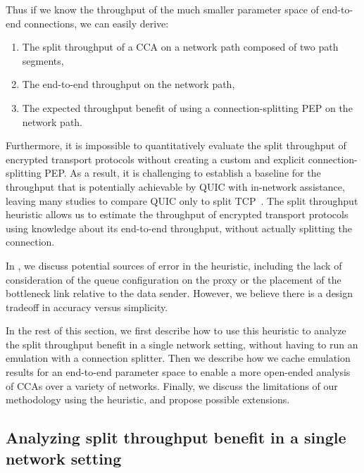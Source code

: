 

\noindent Thus if we know the throughput of the much smaller parameter
 space of end-to-end connections, we can easily derive:

\begin{enumerate}[noitemsep]
    \item The split throughput of a CCA on a network path composed of two path
     segments,
    \item The end-to-end throughput on the network path,
    \item The expected throughput benefit of using a connection-splitting PEP
     on the network path.
\end{enumerate}

Furthermore, it is impossible to quantitatively evaluate the split throughput
of encrypted transport protocols without creating a custom and explicit
connection-splitting PEP. As a result, it is challenging to establish a
baseline for the throughput that is potentially achievable by QUIC with
in-network assistance, leaving many studies to compare QUIC only to split TCP~\cite
{thomas2019google,border2020evaluating,yuan2024sidekick}. The split throughput
heuristic allows us to estimate the throughput of encrypted transport
protocols using knowledge about its end-to-end throughput, without
actually splitting the connection.

In , we discuss potential sources of error in the heuristic,
including the lack of consideration of the queue configuration on the proxy
or the placement of the bottleneck link relative to the data sender. However,
we believe there is a design tradeoff in accuracy versus simplicity.

In the rest of this section, we first describe how to use this heuristic to
analyze the split throughput benefit in a single network setting, without
having to run an emulation with a connection splitter. Then we describe how we
cache emulation results for an end-to-end parameter space to enable a more
open-ended analysis of CCAs over a variety of networks. Finally, we discuss the
limitations of our methodology using the heuristic, and propose possible
extensions.

\subsection{Analyzing split throughput benefit in a single network setting}
\label{sec:splitting:heuristic:example}

